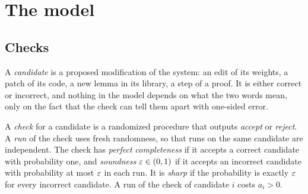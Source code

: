 \section{The model}\label{sec:model}

\subsection{Checks}

A \emph{candidate} is a proposed modification of the system: an edit of its weights, a patch of its code, a new lemma in its library, a step of a proof. It is either correct or incorrect, and nothing in the model depends on what the two words mean, only on the fact that the check can tell them apart with one-sided error.

\begin{definition}[Check]\label{def:check}
A \emph{check} for a candidate is a randomized procedure that outputs \emph{accept} or \emph{reject}. A \emph{run} of the check uses fresh randomness, so that runs on the same candidate are independent. The check has \emph{perfect completeness} if it accepts a correct candidate with probability one, and \emph{soundness} $\varepsilon\in(0,1)$ if it accepts an incorrect candidate with probability at most $\varepsilon$ in each run. It is \emph{sharp} if the probability is exactly $\varepsilon$ for every incorrect candidate. A run of the check of candidate $i$ costs $a_{i}>0$.
\end{definition}


